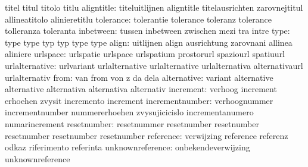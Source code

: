                            titel                     titul
                           titolo                    titlu
               aligntitle: titeluitlijnen            aligntitle
                           titelausrichten           zarovnejtitul
                           allineatitolo             alinieretitlu
                tolerance: tolerantie                tolerance
                           toleranz                  tolerance
                           tolleranza                toleranta
                inbetween: tussen                    inbetween
                           zwischen                  mezi
                           tra                       intre
                     type: type                      type
                           typ                       typ
                           type                      type %
                    align: uitlijnen                 align
                           ausrichtung               zarovnani
                           allinea                   aliniere
                 urlspace: urlspatie                 urlspace
                           urlspatium                prostorurl
                           spaziourl                 spatiuurl
           urlalternative: urlvariant                urlalternative
                           urlalternative            urlalternativa
                           alternativaurl            urlalternativ
                     from: van                       from
                           von                       z
                           da                        dela
              alternative: variant                   alternative
                           alternative               alternativa
                           alternativa               alternativ
                increment: verhoog                   increment
                           erhoehen                  zvysit
                           incremento                increment %
          incrementnumber: verhoognummer             incrementnumber
                           nummererhoehen            zvysujicicislo
                           incrementanumero          numarincrement
resetnumber: resetnummer             resetnumber
             resetnumber             resetnumber
             resetnumber             resetnumber
                reference: verwijzing                reference
                           referenz                  odkaz
                           riferimento               referinta
         unknownreference: onbekendeverwijzing       unknownreference
